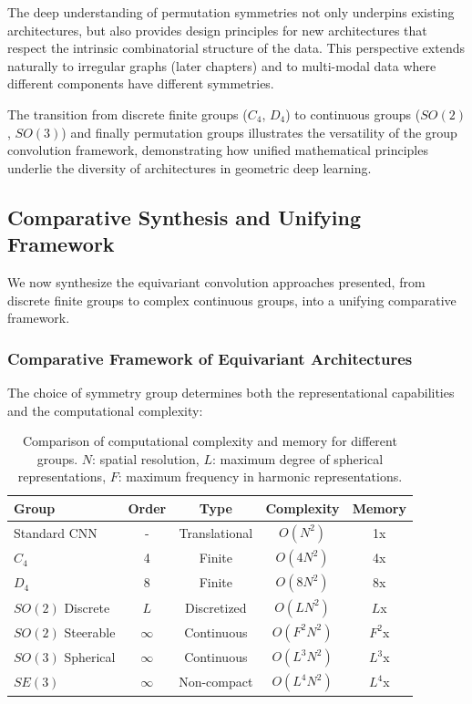 The deep understanding of permutation symmetries not only underpins existing architectures, but also provides design principles for new architectures that respect the intrinsic combinatorial structure of the data. This perspective extends naturally to irregular graphs (later chapters) and to multi-modal data where different components have different symmetries.

The transition from discrete finite groups ($C_4$, $D_4$) to continuous groups ($SO(2)$, $SO(3)$) and finally permutation groups illustrates the versatility of the group convolution framework, demonstrating how unified mathematical principles underlie the diversity of architectures in geometric deep learning.

\subsection{Comparative Synthesis and Unifying Framework}\label{subsec:sintesis_comparativa_gcnn}

We now synthesize the equivariant convolution approaches presented, from discrete finite groups to complex continuous groups, into a unifying comparative framework.

\subsubsection{Comparative Framework of Equivariant Architectures}\label{subsubsec:marco_comparativo_arquitecturas}

The choice of symmetry group determines both the representational capabilities and the computational complexity:

\begin{table}[h]
\centering
\small
\begin{tabular}{|l|c|c|c|c|}
\hline
\textbf{Group} & \textbf{Order} & \textbf{Type} & \textbf{Complexity} & \textbf{Memory} \\
\hline
Standard CNN & - & Translational & $O(N^2)$ & 1x \\
$C_4$ & 4 & Finite & $O(4N^2)$ & 4x \\
$D_4$ & 8 & Finite & $O(8N^2)$ & 8x \\
$SO(2)$ Discrete & $L$ & Discretized & $O(LN^2)$ & $L$x \\
$SO(2)$ Steerable & $\infty$ & Continuous & $O(F^2N^2)$ & $F^2$x \\
$SO(3)$ Spherical & $\infty$ & Continuous & $O(L^3N^2)$ & $L^3$x \\
$SE(3)$ & $\infty$ & Non-compact & $O(L^4N^2)$ & $L^4$x \\
\hline
\end{tabular}
\caption{Comparison of computational complexity and memory for different groups. $N$: spatial resolution, $L$: maximum degree of spherical representations, $F$: maximum frequency in harmonic representations.}
\label{tab:group_complexity_comparison}
\end{table}

